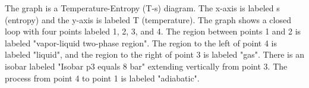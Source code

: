 The graph is a Temperature-Entropy (T-s) diagram. The x-axis is labeled s (entropy) and the y-axis is labeled T (temperature). The graph shows a closed loop with four points labeled 1, 2, 3, and 4. The region between points 1 and 2 is labeled "vapor-liquid two-phase region". The region to the left of point 4 is labeled "liquid", and the region to the right of point 3 is labeled "gas". There is an isobar labeled "Isobar p3 equals 8 bar" extending vertically from point 3. The process from point 4 to point 1 is labeled "adiabatic".